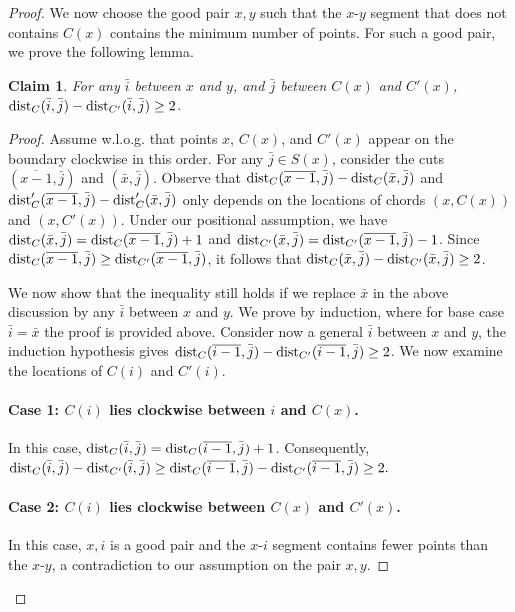 \documentclass[11pt]{article}
\newtheorem{claim}[theorem]{Claim}
\newcommand{\dist}{\textnormal{dist}}
\begin{document}
\begin{proof}
We now choose the good pair $x,y$ such that the $x$-$y$ segment that does not contains $C(x)$ contains the minimum number of points. For such a good pair, we prove the following lemma.
    \begin{claim} \label{clm:ge2}
        For any $\bar i$ between $x$ and $y$, and $\bar j$ between $C(x)$ and $C'(x)$, $\dist_C(\bar i,\bar j)-\dist_{C'}(\bar i,\bar j)\ge 2$.
    \end{claim}
    \begin{proof}
Assume w.l.o.g. that points $x$, $C(x)$, and $C'(x)$ appear on the boundary clockwise in this order. For any $\bar j \in S(x)$, consider the cuts $(\overline{x-1},\bar j)$ and $(\bar x,\bar j)$. Observe that 
$\dist_C(\overline{x-1},\bar j)-\dist_C(\bar x,\bar j)$ and
$\dist_C'(\overline{x-1},\bar j)-\dist_C'(\bar x,\bar j)$ only depends on the locations of chords $(x,C(x))$ and $(x,C'(x))$. Under our positional assumption, we have $\dist_C(\bar x,\bar j)=\dist_C(\overline{x-1},\bar j)+1$ and $\dist_{C'}(\bar x,\bar j)=\dist_{C'}(\overline{x-1},\bar j)-1$. Since $\dist_C(\overline{x-1},\bar j)\ge\dist_{C'}(\overline{x-1},\bar j)$, it follows that $\dist_C(\bar x,\bar j)-\dist_{C'}(\bar x,\bar j)\ge 2$.

We now show that the inequality still holds if we replace $\bar x$ in the above discussion by any $\bar i$ between $x$ and $y$. We prove by induction, where for base case $\bar i = \bar x$ the proof is provided above.
Consider now a general $\bar i$ between $x$ and $y$, the induction hypothesis gives $\dist_C(\overline{i-1},\bar j)-\dist_{C'}(\overline{i-1},\bar j)\ge 2$. We now examine the locations of $C(i)$ and $C'(i)$.

\paragraph{Case 1: $C(i)$ lies clockwise between $i$ and $C(x)$.} In this case, $\dist_C(\bar i,\bar j)=\dist_C(\overline{i-1},\bar j)+1$. Consequently,
$\dist_C(\bar i,\bar j)-\dist_{C'}(\bar i,\bar j)\ge \dist_C(\overline{i-1},\bar j)-\dist_{C'}(\overline{i-1},\bar j)\ge 2.$

\paragraph{Case 2: $C(i)$ lies clockwise between $C(x)$ and $C'(x)$.} In this case, $x,i$ is a good pair and the $x$-$i$ segment contains fewer points than the $x$-$y$, a contradiction to our assumption on the pair $x,y$.


\end{proof}
\end{proof}
\end{document}
